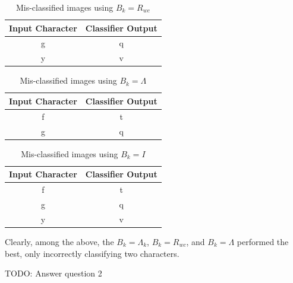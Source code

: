 \documentclass{article}
\begin{document}
\begin{table}[H]
    \centering
    \begin{tabular}{|c|c|}
        \hline
        Input Character & Classifier Output \\
        \hline
        g & q \\
        \hline
        y & v \\
        \hline
    \end{tabular}
    \caption{Mis-classified images using $B_k = R_{wc}$}
\end{table}

\begin{table}[H]
    \centering
    \begin{tabular}{|c|c|}
        \hline
        Input Character & Classifier Output \\
        \hline
        f & t \\
        \hline
        g & q \\
        \hline
    \end{tabular}
    \caption{Mis-classified images using $B_k = \Lambda$}
\end{table}

\begin{table}[H]
    \centering
    \begin{tabular}{|c|c|}
        \hline
        Input Character & Classifier Output \\
        \hline
        f & t \\
        \hline
        g & q \\
        \hline
        y & v \\
        \hline
    \end{tabular}
    \caption{Mis-classified images using $B_k = I$}
\end{table}

Clearly, among the above, the $B_k = \Lambda_k$, $B_k = R_{wc}$, and $B_k = \Lambda$ performed the best, only incorrectly classifying two characters.

TODO: Answer question 2
\end{document}
